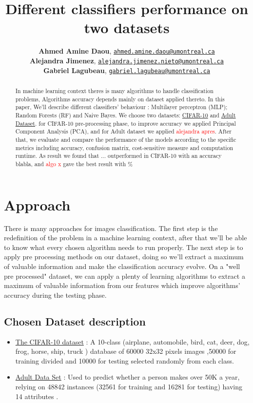 \documentclass{article}
\title{Different classifiers performance on two datasets}
\author{%
  \textbf{Ahmed Amine Daou},  \texttt{\href{mailto:ahmed.aminedaou@umontreal.ca}{ahmed.amine.daou@umontreal.ca}} \\  
  \textbf{Alejandra Jimenez}, \texttt{\href{mailto:alejandra.jimenez.nieto@umontreal.ca}{alejandra.jimenez.nieto@umontreal.ca}} \\
  \textbf{Gabriel Lagubeau}, \texttt{\href{mailto:gabriel.lagubeau@umontreal.ca}{gabriel.lagubeau@umontreal.ca}} 
}
\begin{document}
\maketitle
\begin{abstract}
  In machine learning context theres is many algorithms to handle  classification problems, Algorithms accuracy depends mainly on dataset applied thereto. In this paper, We'll describe different classifiers' behaviour : Multilayer perceptron (MLP); Random
Forests (RF) and Naive Bayes. We choose two datasets: \href{https://www.cs.toronto.edu/~kriz/cifar.html}{CIFAR-10} and \href{https://archive.ics.uci.edu/ml/datasets/adult}{Adult Dataset}. for CIFAR-10 pre-processing phase, to improve accuracy
we applied Principal Component Analysis (PCA), and for Adult dataset we applied \textcolor{red}{alejandra apres}. After that, we evaluate and compare the performance of the models according to the specific metrics including accuracy, confusion matrix, cost-sensitive measure and computation runtime. As result we found that ... outperformed in CIFAR-10 with an accuracy blabla, and \textcolor{red}{algo x } gave the best result with \%
\end{abstract}

\section{Approach}
There is many approaches for images classification. The first step is the redefinition of the problem in a machine learning context, after that we'll be able to know what every chosen algorithm needs to run properly. The  next  step
is  to apply pre processing methods on our dataset,  doing so we'll extract a maximum of valuable information and make the classification accuracy evolve.
On a "well pre processed" dataset,  we can apply  a  plenty  of 
learning algorithms to extract a maximum of valuable information from our features which improve algorithms' accuracy during the testing phase.


 \subsection{Chosen Dataset description}
\begin{itemize}
\item \href{https://www.cs.toronto.edu/~kriz/cifar.html}{The CIFAR-10 dataset}
: A 10-class (airplane, automobile, bird, cat, deer, dog, frog, horse, ship, truck ) database of  60000 32x32 pixels images ,50000 for training divided and 10000 for testing selected randomly from each class.
\item \href{http://archive.ics.uci.edu/ml/datasets/Adult}{Adult Data Set} : Used to predict whether a person makes over 50K a year, relying on 48842 instances (32561 for training and 16281 for testing)  having 14 attributes .\end{itemize}
\end{document}
